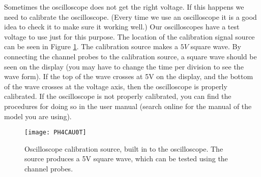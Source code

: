 
Sometimes the oscilloscope does not get the right voltage. If this
happens we need to calibrate the oscilloscope. (Every time we use an
oscilloscope it is a good idea to check it to make sure it working well.) Our
oscilloscopes have a test voltage to use just for this purpose. The location
of the calibration signal source can be seen in Figure
\ref{fig:oscilloscope_calibration}. 
The calibration source makes a $5\unit{V}$ square wave. 
By connecting the channel probes to the calibration source, a square wave
should be seen on the display (you may have to change the time per division
to see the wave form). If the top of the wave crosses at 5V on the display,
and the bottom of the wave crosses at the voltage axis, then the oscilloscope
is properly calibrated. If the oscilloscope is not properly calibrated, you
can find the procedures for doing so in the user manual (search 
online for the manual
of the model you are using).
\begin{figure}[htbp!]
\centering
\texttt{[image: PH4CAU0T]}
\caption[Oscilloscope calibration source]{Oscilloscope calibration source, 
built in to the oscilloscope. The source produces a 5V square wave, which can
be tested using the channel probes.}
\label{fig:oscilloscope_calibration}
\end{figure}


